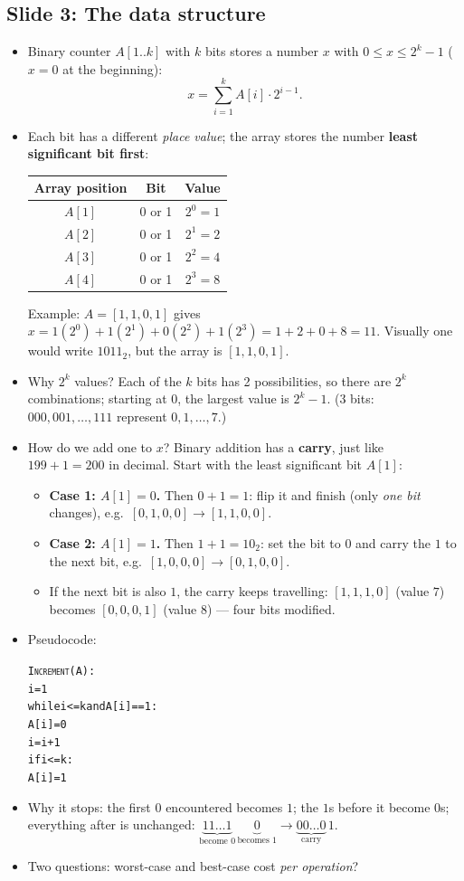 \documentclass[11pt]{article}
\newcommand{\slide}[2]{\subsection*{Slide #1: #2}}
\begin{document}
\slide{3}{The data structure}
\begin{itemize}
  \item Binary counter $A[1..k]$ with $k$ bits stores a number $x$ with $0 \le x \le 2^k - 1$ ($x = 0$ at the beginning):
        \[ x = \sum_{i=1}^{k} A[i] \cdot 2^{i-1}. \]
  \item Each bit has a different \emph{place value}; the array stores the number \textbf{least significant bit first}:
        \begin{center}
        \begin{tabular}{ccc}
          \hline
          Array position & Bit & Value \\
          \hline
          $A[1]$ & 0 or 1 & $2^0 = 1$ \\
          $A[2]$ & 0 or 1 & $2^1 = 2$ \\
          $A[3]$ & 0 or 1 & $2^2 = 4$ \\
          $A[4]$ & 0 or 1 & $2^3 = 8$ \\
          \hline
        \end{tabular}
        \end{center}
        Example: $A = [1,1,0,1]$ gives $x = 1(2^0) + 1(2^1) + 0(2^2) + 1(2^3) = 1 + 2 + 0 + 8 = 11$. Visually one would write $1011_2$, but the array is $[1,1,0,1]$.
  \item Why $2^k$ values? Each of the $k$ bits has 2 possibilities, so there are $2^k$ combinations; starting at $0$, the largest value is $2^k - 1$. (3 bits: $000, 001, \ldots, 111$ represent $0, 1, \ldots, 7$.)
  \item How do we add one to $x$? Binary addition has a \textbf{carry}, just like $199 + 1 = 200$ in decimal. Start with the least significant bit $A[1]$:
  \begin{itemize}
    \item \textbf{Case 1: $A[1] = 0$.} Then $0 + 1 = 1$: flip it and finish (only \emph{one bit} changes), e.g.\ $[0,1,0,0] \to [1,1,0,0]$.
    \item \textbf{Case 2: $A[1] = 1$.} Then $1 + 1 = 10_2$: set the bit to $0$ and carry the $1$ to the next bit, e.g.\ $[1,0,0,0] \to [0,1,0,0]$.
    \item If the next bit is also $1$, the carry keeps travelling: $[1,1,1,0]$ (value $7$) becomes $[0,0,0,1]$ (value $8$) --- four bits modified.
  \end{itemize}
  \item Pseudocode:
        \begin{alltt}
\textsc{Increment}(A):
    i = 1
    while i <= k and A[i] == 1:
        A[i] = 0
        i = i + 1
    if i <= k:
        A[i] = 1
        \end{alltt}
  \item Why it stops: the first $0$ encountered becomes $1$; the $1$s before it become $0$s; everything after is unchanged: $\underbrace{11\ldots1}_{\text{become 0}}\,\underbrace{0}_{\text{becomes 1}} \to \underbrace{00\ldots0}_{\text{carry}}\,1$.
  \item Two questions: worst-case and best-case cost \emph{per operation}?
\end{itemize}
\end{document}
